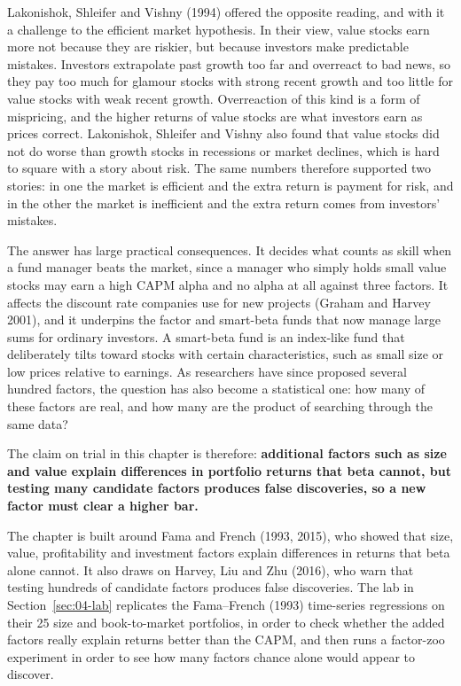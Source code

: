 Lakonishok, Shleifer and Vishny (1994) offered the opposite reading, and with it a challenge to the efficient market hypothesis. In their view, value stocks earn more not because they are riskier, but because investors make predictable mistakes. Investors extrapolate past growth too far and overreact to bad news, so they pay too much for glamour stocks with strong recent growth and too little for value stocks with weak recent growth. Overreaction of this kind is a form of mispricing, and the higher returns of value stocks are what investors earn as prices correct. Lakonishok, Shleifer and Vishny also found that value stocks did not do worse than growth stocks in recessions or market declines, which is hard to square with a story about risk. The same numbers therefore supported two stories: in one the market is efficient and the extra return is payment for risk, and in the other the market is inefficient and the extra return comes from investors' mistakes.

The answer has large practical consequences. It decides what counts as skill when a fund manager beats the market, since a manager who simply holds small value stocks may earn a high CAPM alpha and no alpha at all against three factors. It affects the discount rate companies use for new projects (Graham and Harvey 2001), and it underpins the factor and smart-beta funds that now manage large sums for ordinary investors. A smart-beta fund is an index-like fund that deliberately tilts toward stocks with certain characteristics, such as small size or low prices relative to earnings. As researchers have since proposed several hundred factors, the question has also become a statistical one: how many of these factors are real, and how many are the product of searching through the same data? 

The claim on trial in this chapter is therefore: \textbf{additional factors such as size and value explain differences in portfolio returns that beta cannot, but testing many candidate factors produces false discoveries, so a new factor must clear a higher bar.}

The chapter is built around Fama and French (1993, 2015), who showed that size, value, profitability and investment factors explain differences in returns that beta alone cannot. It also draws on Harvey, Liu and Zhu (2016), who warn that testing hundreds of candidate factors produces false discoveries. The lab in Section~\ref{sec:04-lab} replicates the Fama--French (1993) time-series regressions on their 25 size and book-to-market portfolios, in order to check whether the added factors really explain returns better than the CAPM, and then runs a factor-zoo experiment in order to see how many factors chance alone would appear to discover.

